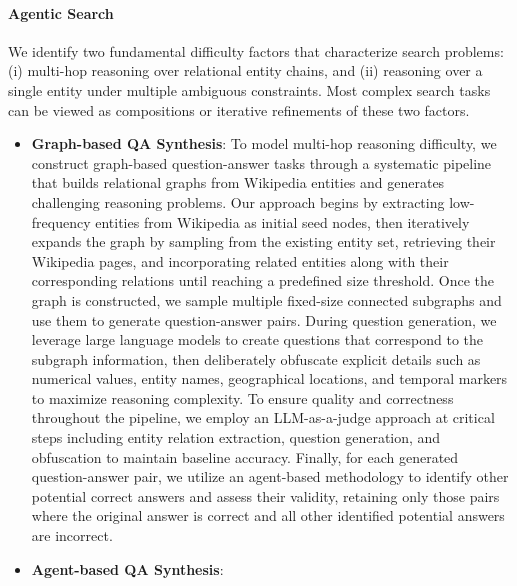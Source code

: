 \documentclass{article}
\begin{document}
\paragraph{Agentic Search}
We identify two fundamental difficulty factors that characterize search problems: (i) multi-hop reasoning over relational entity chains, and (ii) reasoning over a single entity under multiple ambiguous constraints. Most complex search tasks can be viewed as compositions or iterative refinements of these two factors.
\begin{itemize}
    \item \textbf{Graph-based QA Synthesis}: 
    To model multi-hop reasoning difficulty, we construct graph-based question-answer tasks through a systematic pipeline that builds relational graphs from Wikipedia entities and generates challenging reasoning problems. Our approach begins by extracting low-frequency entities from Wikipedia as initial seed nodes, then iteratively expands the graph by sampling from the existing entity set, retrieving their Wikipedia pages, and incorporating related entities along with their corresponding relations until reaching a predefined size threshold. Once the graph is constructed, we sample multiple fixed-size connected subgraphs and use them to generate question-answer pairs. During question generation, we leverage large language models to create questions that correspond to the subgraph information, then deliberately obfuscate explicit details such as numerical values, entity names, geographical locations, and temporal markers to maximize reasoning complexity. To ensure quality and correctness throughout the pipeline, we employ an LLM-as-a-judge approach at critical steps including entity relation extraction, question generation, and obfuscation to maintain baseline accuracy. Finally, for each generated question-answer pair, we utilize an agent-based methodology to identify other potential correct answers and assess their validity, retaining only those pairs where the original answer is correct and all other identified potential answers are incorrect.
    \item \textbf{Agent-based QA Synthesis}: 

\end{itemize}
\end{document}
